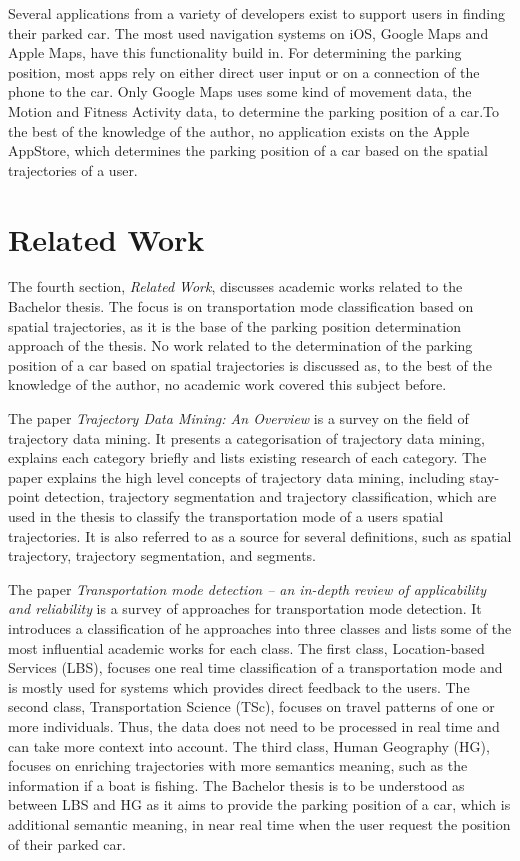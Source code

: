 Several applications from a variety of developers exist to support users in finding their parked car. The most used navigation systems on iOS, Google Maps and Apple Maps, have this functionality build in. For determining the parking position, most apps rely on either direct user input or on a connection of the phone to the car. Only Google Maps uses some kind of movement data, the Motion and Fitness Activity data, to determine the parking position of a car.To the best of the knowledge of the author, no application exists on the Apple AppStore, which determines the parking position of a car based on the spatial trajectories of a user.


\section{Related Work}
The fourth section, \textit{Related Work}, discusses academic works related to the Bachelor thesis. The focus is on transportation mode classification based on spatial trajectories, as it is the base of the parking position determination approach of the thesis. No work related to the determination of the parking position of a car based on spatial trajectories is discussed as, to the best of the knowledge of the author, no academic work covered this subject before.

The paper \textit{Trajectory Data Mining: An Overview} \cite{Zheng:2015:TDM:2764959.2743025} is a survey on the field of trajectory data mining. It presents a categorisation of trajectory data mining, explains each category briefly and lists existing research of each category.\newline
The paper explains the high level concepts of trajectory data mining, including stay-point detection, trajectory segmentation and trajectory classification, which are used in the thesis to classify the transportation mode of a users spatial trajectories. It is also referred to as a source for several definitions, such as spatial trajectory, trajectory segmentation, and segments.

The paper \textit{Transportation mode detection – an in-depth review of applicability and reliability} \cite{Prelipcean2017} is a survey of approaches for transportation mode detection. It introduces a classification of he approaches into three classes and lists some of the most influential academic works for each class. The first class, Location-based Services (LBS), focuses one real time classification of a transportation mode and is mostly used for systems which provides direct feedback to the users. The second class, Transportation Science (TSc), focuses on travel patterns of one or more individuals. Thus, the data does not need to be processed in real time and can take more context into account. The third class, Human Geography (HG), focuses on enriching trajectories with more semantics meaning, such as the information if a boat is fishing.\newline
The Bachelor thesis is to be understood as between LBS and HG as it aims to provide the parking position of a car, which is additional semantic meaning, in near real time when the user request the position of their parked car. 

